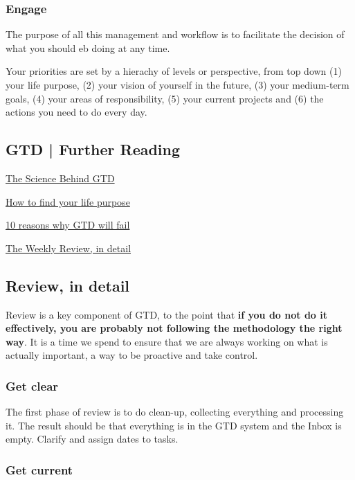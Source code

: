 \subsubsection*{Engage}

The purpose of all this management and workflow is to facilitate the decision of what you should eb doing at any time.

Your priorities are set by a hierachy of levels or perspective, from top down (1) your life purpose, (2) your vision of yourself in the future, (3) your medium-term goals, (4) your areas of responsibility, (5) your current projects and (6) the actions you need to do every day.

\subsection{GTD | Further Reading}

\href{https://facilethings.com/blog/en/science}{The Science Behind GTD}

\href{https://facilethings.com/blog/en/life-purpose}{How to find your life purpose}

\href{https://facilethings.com/blog/en/why-gtd-fails}{10 reasons why GTD will fail}

\href{https://facilethings.com/blog/en/weekly-review}{The Weekly Review, in detail}

\subsection{Review, in detail}

Review is a key component of GTD, to the point that \textbf{if you do not do it effectively, you are probably not following the methodology the right way}. It is a time we spend to ensure that we are always working on what is actually important, a way to be proactive and take control.

\subsubsection*{Get clear}

The first phase of review is to do clean-up, collecting everything and processing it. The result should be that everything is in the GTD system and the Inbox is empty. Clarify and assign dates to tasks.

\subsubsection*{Get current}

